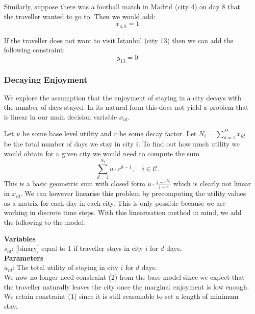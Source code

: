 \documentclass[12pt]{article}
\begin{document}
Similarly, suppose there was a football match in Madrid (city 4) on day 8 that the traveller wanted to go to. Then we would add:
\begin{equation*}
x_{4,8} = 1
\end{equation*}

If the traveller does not want to visit Istanbul (city 13) then we can add the following constraint:
\begin{equation*}
y_{13} =0
\end{equation*}


\newpage
\subsubsection{Decaying Enjoyment}
We explore the assumption that the enjoyment of staying in a city decays with the number of days stayed. In its natural form this does not yield a problem that is linear in our main decision variable $x_{id}$.

Let $u$ be some base level utility and $r$ be some decay factor. Let $N_i=\sum_{d=1}^D x_{id}$ be the total number of days we stay in city $i$. To find out how much utility we would obtain for a given city we would need to compute the sum
\begin{equation*}
	\sum\limits_{d=1}^{N_{i}} u \cdot r^{d-1}, \quad i \in \mathcal{C}.
\end{equation*}
This is a basic geometric sum with closed form $u \cdot \frac{1-r^{N_i}}{1-r}$ which is clearly not linear in $x_{id}$. We can however linearise this problem by precomputing the utility values as a matrix for each day in each city. This is only possible because we are working in discrete time steps. With this linearisation method in mind, we add the following to the model.

\textbf{Variables}\\
$s_{id}$: [binary] equal to 1 if traveller stays in city $i$ for $d$ days.\\

\textbf{Parameters} \\
$u_{id}$: The total utility of staying in city $i$ for $d$ days.\\

We now no longer need constraint (2) from the base model since we expect that the traveller naturally leaves the city once the marginal enjoyment is low enough. We retain constraint (1) since it is still reasonable to set a length of minimum stay.
\end{document}
